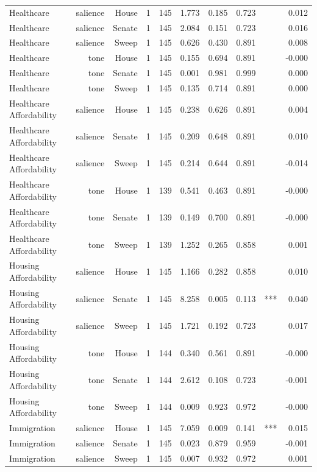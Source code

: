 \begin{table}[htbp]
\begin{tabular}{lrrrrrrrrr}
Healthcare & salience & House & 1 & 145 & 1.773 & 0.185 & 0.723 &  & 0.012 \\
Healthcare & salience & Senate & 1 & 145 & 2.084 & 0.151 & 0.723 &  & 0.016 \\
Healthcare & salience & Sweep & 1 & 145 & 0.626 & 0.430 & 0.891 &  & 0.008 \\
Healthcare & tone & House & 1 & 145 & 0.155 & 0.694 & 0.891 &  & -0.000 \\
Healthcare & tone & Senate & 1 & 145 & 0.001 & 0.981 & 0.999 &  & 0.000 \\
Healthcare & tone & Sweep & 1 & 145 & 0.135 & 0.714 & 0.891 &  & 0.000 \\
Healthcare Affordability & salience & House & 1 & 145 & 0.238 & 0.626 & 0.891 &  & 0.004 \\
Healthcare Affordability & salience & Senate & 1 & 145 & 0.209 & 0.648 & 0.891 &  & 0.010 \\
Healthcare Affordability & salience & Sweep & 1 & 145 & 0.214 & 0.644 & 0.891 &  & -0.014 \\
Healthcare Affordability & tone & House & 1 & 139 & 0.541 & 0.463 & 0.891 &  & -0.000 \\
Healthcare Affordability & tone & Senate & 1 & 139 & 0.149 & 0.700 & 0.891 &  & -0.000 \\
Healthcare Affordability & tone & Sweep & 1 & 139 & 1.252 & 0.265 & 0.858 &  & 0.001 \\
Housing Affordability & salience & House & 1 & 145 & 1.166 & 0.282 & 0.858 &  & 0.010 \\
Housing Affordability & salience & Senate & 1 & 145 & 8.258 & 0.005 & 0.113 & *** & 0.040 \\
Housing Affordability & salience & Sweep & 1 & 145 & 1.721 & 0.192 & 0.723 &  & 0.017 \\
Housing Affordability & tone & House & 1 & 144 & 0.340 & 0.561 & 0.891 &  & -0.000 \\
Housing Affordability & tone & Senate & 1 & 144 & 2.612 & 0.108 & 0.723 &  & -0.001 \\
Housing Affordability & tone & Sweep & 1 & 144 & 0.009 & 0.923 & 0.972 &  & -0.000 \\
Immigration & salience & House & 1 & 145 & 7.059 & 0.009 & 0.141 & *** & 0.015 \\
Immigration & salience & Senate & 1 & 145 & 0.023 & 0.879 & 0.959 &  & -0.001 \\
Immigration & salience & Sweep & 1 & 145 & 0.007 & 0.932 & 0.972 &  & 0.001 \\

\end{tabular}
\end{table}
